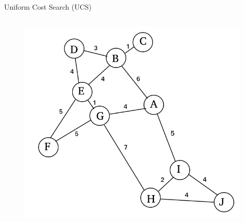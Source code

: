 \documentclass{beamer}
\begin{document}
\begin{frame}{Uniform Cost Search (UCS)}
	\begin{columns}[T]
		\begin{column}{.48\textwidth}
			\begin{figure}
			\centering
				\includegraphics[width=1.3\linewidth]{example_weights.jpg}
			\end{figure}
		\end{column}
		

\end{columns}
\end{frame}
\end{document}

